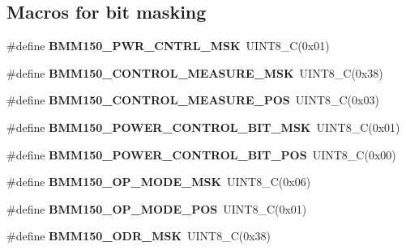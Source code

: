 \subsection*{Macros for bit masking}
\begin{DoxyCompactItemize}
\item 
\mbox{\label{group___b_m_m150_ga6656c33f4ff3c1c007e9b82335cf38ab}} 
\#define {\bfseries B\+M\+M150\+\_\+\+P\+W\+R\+\_\+\+C\+N\+T\+R\+L\+\_\+\+M\+SK}~U\+I\+N\+T8\+\_\+C(0x01)
\item 
\mbox{\label{group___b_m_m150_ga545c4a7ba4722500d6a2821aabe0e699}} 
\#define {\bfseries B\+M\+M150\+\_\+\+C\+O\+N\+T\+R\+O\+L\+\_\+\+M\+E\+A\+S\+U\+R\+E\+\_\+\+M\+SK}~U\+I\+N\+T8\+\_\+C(0x38)
\item 
\mbox{\label{group___b_m_m150_gaab1625dbd6972438a129d2e32f08a16d}} 
\#define {\bfseries B\+M\+M150\+\_\+\+C\+O\+N\+T\+R\+O\+L\+\_\+\+M\+E\+A\+S\+U\+R\+E\+\_\+\+P\+OS}~U\+I\+N\+T8\+\_\+C(0x03)
\item 
\mbox{\label{group___b_m_m150_gae25146f0841521534b67f6fa5fa5218d}} 
\#define {\bfseries B\+M\+M150\+\_\+\+P\+O\+W\+E\+R\+\_\+\+C\+O\+N\+T\+R\+O\+L\+\_\+\+B\+I\+T\+\_\+\+M\+SK}~U\+I\+N\+T8\+\_\+C(0x01)
\item 
\mbox{\label{group___b_m_m150_ga0c2108207a9b05c12663216db43cd953}} 
\#define {\bfseries B\+M\+M150\+\_\+\+P\+O\+W\+E\+R\+\_\+\+C\+O\+N\+T\+R\+O\+L\+\_\+\+B\+I\+T\+\_\+\+P\+OS}~U\+I\+N\+T8\+\_\+C(0x00)
\item 
\mbox{\label{group___b_m_m150_ga2ed8b124283f5a8b052fd31ae7dda569}} 
\#define {\bfseries B\+M\+M150\+\_\+\+O\+P\+\_\+\+M\+O\+D\+E\+\_\+\+M\+SK}~U\+I\+N\+T8\+\_\+C(0x06)
\item 
\mbox{\label{group___b_m_m150_gafda9fb86796f4c4b4e703f492ce216ed}} 
\#define {\bfseries B\+M\+M150\+\_\+\+O\+P\+\_\+\+M\+O\+D\+E\+\_\+\+P\+OS}~U\+I\+N\+T8\+\_\+C(0x01)
\item 
\mbox{\label{group___b_m_m150_gac356fd2c804c2da853436e16201bb39e}} 
\#define {\bfseries B\+M\+M150\+\_\+\+O\+D\+R\+\_\+\+M\+SK}~U\+I\+N\+T8\+\_\+C(0x38)

\end{DoxyCompactItemize}
